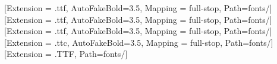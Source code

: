 \usepackage{siunitx}
\usepackage{relsize}
\usepackage{ulem}
\usepackage{array}
\usepackage{float}
\usepackage{cancel}
\usepackage{stackengine}
\stackMath

\usepackage{pifont}

\newCJKfontfamily{}[Extension = .ttf, AutoFakeBold=3.5, Mapping = full-stop, Path=fonts/]
\newCJKfontfamily{}[Extension = .ttf, AutoFakeBold=3.5, Mapping = full-stop, Path=fonts/]
\newCJKfontfamily{}[Extension = .ttf, AutoFakeBold=3.5, Mapping = full-stop, Path=fonts/]
\newCJKfontfamily{}[Extension = .ttc, AutoFakeBold=3.5, Mapping = full-stop, Path=fonts/]
\newCJKfontfamily{}[Extension = .TTF, Path=fonts/]




\newcommand{\chuhao}{\fontsize{42pt}{\baselineskip}\selectfont}
\newcommand{\xiaochuhao}{\fontsize{36pt}{\baselineskip}\selectfont}
\newcommand{\yihao}{\fontsize{26pt}{\baselineskip}\selectfont}
\newcommand{\erhao}{\fontsize{22pt}{\baselineskip}\selectfont}
\newcommand{\xiaoerhao}{\fontsize{18pt}{\baselineskip}\selectfont}
\newcommand{\sanhao}{\fontsize{16pt}{\baselineskip}\selectfont}
\newcommand{\sihao}{\fontsize{14pt}{\baselineskip}\selectfont}
\newcommand{\xiaosihao}{\fontsize{12pt}{\baselineskip}\selectfont}
\newcommand{\wuhao}{\fontsize{10.5pt}{\baselineskip}\selectfont}
\newcommand{\xiaowuhao}{\fontsize{9pt}{\baselineskip}\selectfont}
\newcommand{\liuhao}{\fontsize{7.5pt}{\baselineskip}\selectfont}
\newcommand{\xiaoliuhao}{\fontsize{6.5pt}{\baselineskip}\selectfont}
\newcommand{\qihao}{\fontsize{5.5pt}{\baselineskip}\selectfont}
\newcommand{\bahao}{\fontsize{5pt}{\baselineskip}\selectfont}

